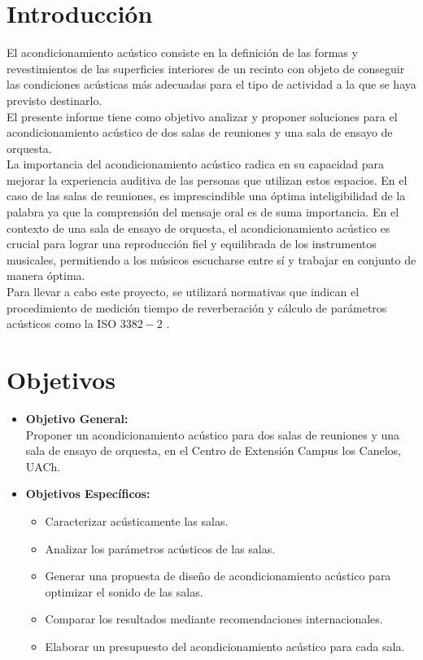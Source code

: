 \section{Introducción}
El acondicionamiento acústico consiste en la definición de las formas y revestimientos 
de las superficies interiores de un recinto con objeto de conseguir las condiciones acústicas más 
adecuadas para el tipo de actividad a la que se haya previsto destinarlo.\cite{carrion1990diseno} \\
El presente informe tiene como objetivo analizar y proponer soluciones para el acondicionamiento acústico 
de dos salas de reuniones y una sala de ensayo de orquesta. \\
\noindent
La importancia del acondicionamiento acústico radica en su capacidad para mejorar la experiencia auditiva 
de las personas que utilizan estos espacios. En el caso de las salas de reuniones, es imprescindible una óptima 
inteligibilidad de la palabra ya que la comprensión del mensaje oral es de suma importancia. \cite{carrion1990diseno}
En el contexto de una sala de ensayo de orquesta, el acondicionamiento acústico es crucial para lograr una reproducción 
fiel y equilibrada de los instrumentos musicales, permitiendo a los músicos escucharse entre sí y trabajar en conjunto 
de manera óptima. \\
\noindent
Para llevar a cabo este proyecto, se utilizará normativas que indican el procedimiento de medición tiempo de reverberación y cálculo de parámetros acústicos como la ISO $3382-2$ \cite{ISO3382-2}.

\section{Objetivos}
\begin{itemize}
    \item \textbf{Objetivo General:} \\
    Proponer un acondicionamiento acústico para dos salas de reuniones y una sala de ensayo de orquesta, en el Centro de Extensión Campus los Canelos, UACh.

    \item \textbf{Objetivos Específicos:}
    \begin{itemize}
        \item Caracterizar acústicamente las salas.
        \item Analizar los parámetros acústicos de las salas.
        \item Generar una propuesta de diseño de acondicionamiento acústico para optimizar el sonido de las salas.
        \item Comparar los resultados mediante recomendaciones internacionales. 
        \item Elaborar un presupuesto del acondicionamiento acústico para cada sala.

    \end{itemize}
\end{itemize}